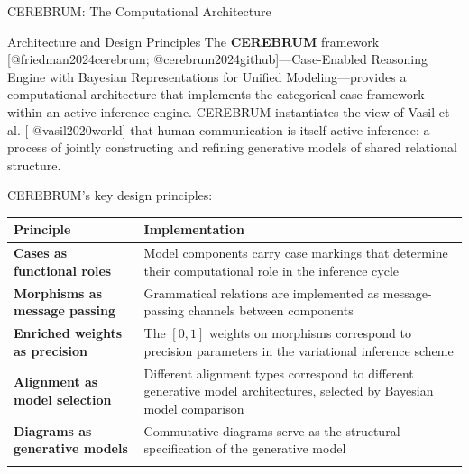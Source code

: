 \documentclass[
  ignorenonframetext,
]{beamer}
\newcounter{none} %
\begin{document}
\begin{frame}{CEREBRUM: The Computational Architecture}
\protect{}\label{cerebrum-the-computational-architecture}
\begin{block}{Architecture and Design Principles}
\protect{}\label{architecture-and-design-principles}
The \textbf{CEREBRUM} framework {[}@friedman2024cerebrum;
@cerebrum2024github{]}---Case-Enabled Reasoning Engine with Bayesian
Representations for Unified Modeling---provides a computational
architecture that implements the categorical case framework within an
active inference engine. CEREBRUM instantiates the view of Vasil et al.
{[}-@vasil2020world{]} that human communication is itself active
inference: a process of jointly constructing and refining generative
models of shared relational structure.

CEREBRUM's key design principles:

{\def\LTcaptype{none} %
\begin{longtable}[]{@{}
  >{\raggedright\arraybackslash}p{}
  >{\raggedright\arraybackslash}p{}@{}}
\toprule\noalign{}
\begin{minipage}[b]{\linewidth}\raggedright
Principle
\end{minipage} & \begin{minipage}[b]{\linewidth}\raggedright
Implementation
\end{minipage} \\
\midrule\noalign{}
\endhead
\textbf{Cases as functional roles} & Model components carry case
markings that determine their computational role in the inference
cycle \\
\textbf{Morphisms as message passing} & Grammatical relations are
implemented as message-passing channels between components \\
\textbf{Enriched weights as precision} & The \([0,1]\) weights on
morphisms correspond to precision parameters in the variational
inference scheme \\
\textbf{Alignment as model selection} & Different alignment types
correspond to different generative model architectures, selected by
Bayesian model comparison \\
\textbf{Diagrams as generative models} & Commutative diagrams serve as
the structural specification of the generative model \\
\bottomrule\noalign{}
\end{longtable}
}
\end{block}


\end{frame}
\end{document}
